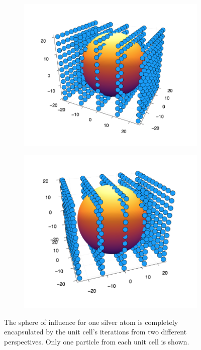 \begin{figure}
  \centering
  \begin{subfigure}{0.53\textwidth}
    \includegraphics[width=\linewidth]{Figures/iteratedUnitCell}
    \label{iteratedUnitCellFirst}
  \end{subfigure}%
  \hspace*{\fill}   %
  \begin{subfigure}{0.5\textwidth}
    \includegraphics[width=\linewidth]{Figures/iteratedUnitCell2}
    \label{iteratedUnitCellSecond}
  \end{subfigure}
\caption{The sphere of influence for one silver atom is completely encapsulated by the unit cell's iterations from two different perspectives. Only one particle from each unit cell is shown.} \label{iteratedUnitCells}
\end{figure}

